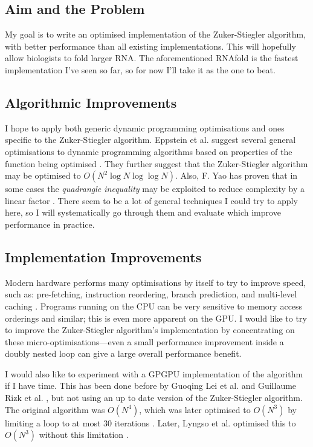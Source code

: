 \documentclass{cshonours}
\def\etal{et al. }
\begin{document}
\begin{appendices}
\section*{Aim and the Problem}
My goal is to write an optimised implementation of the Zuker-Stiegler algorithm, with better performance than all existing implementations. This will hopefully allow biologists to fold larger RNA. The aforementioned RNAfold is the fastest implementation I've seen so far, so for now I'll take it as the one to beat.

\subsection*{Algorithmic Improvements}
I hope to apply both generic dynamic programming optimisations and ones specific to the Zuker-Stiegler algorithm. Eppstein \etal suggest several general optimisations to dynamic programming algorithms based on properties of the function being optimised \cite{eppsteinSpeedingUpDp}. They further suggest that the Zuker-Stiegler algorithm may be optimised to $O(N^2\log{N}\log{\log{N}})$. Also, F. Yao has proven that in some cases the \emph{quadrangle inequality} may be exploited to reduce complexity by a linear factor \cite{yaoSpeedingUpDp}. There seem to be a lot of general techniques I could try to apply here, so I will systematically go through them and evaluate which improve performance in practice.

\subsection*{Implementation Improvements}
Modern hardware performs many optimisations by itself to try to improve speed, such as: pre-fetching, instruction reordering, branch prediction, and multi-level caching \cite{drepperMemory}. Programs running on the CPU can be very sensitive to memory access orderings and similar; this is even more apparent on the GPU. I would like to try to improve the Zuker-Stiegler algorithm's implementation by concentrating on these micro-optimisations---even a small performance improvement inside a doubly nested loop can give a large overall performance benefit.

I would also like to experiment with a GPGPU implementation of the algorithm if I have time. This has been done before by Guoqing Lei \etal \cite{leiGpu} and Guillaume Rizk \etal \cite{rizkGpu}, but not using an up to date version of the Zuker-Stiegler algorithm. The original algorithm was $O(N^4)$, which was later optimised to $O(N^3)$ by limiting a loop to at most 30 iterations \cite{lyngsoOptimisation}. Later, Lyngso \etal optimised this to $O(N^3)$ without this limitation \cite{lyngsoPseudoknot}. 


\end{appendices}
\end{document}
